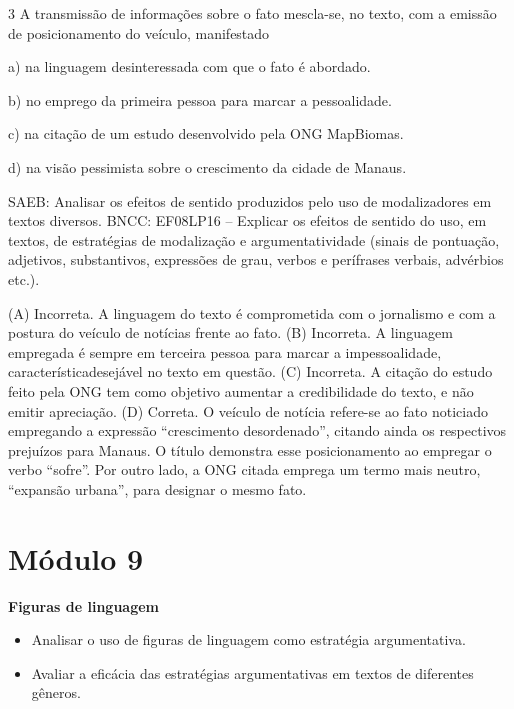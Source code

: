 \num{3} A transmissão de informações sobre o fato mescla-se, no texto,
com a emissão de posicionamento do veículo, manifestado

a) na linguagem desinteressada com que o fato é abordado.

b) no emprego da primeira pessoa para marcar a pessoalidade.

c) na citação de um estudo desenvolvido pela ONG MapBiomas.

d) na visão pessimista sobre o crescimento da cidade de Manaus.

SAEB: Analisar os efeitos de sentido produzidos pelo uso de
modalizadores em textos diversos. BNCC: EF08LP16 -- Explicar os efeitos
de sentido do uso, em textos, de estratégias de modalização e
argumentatividade (sinais de pontuação, adjetivos, substantivos,
expressões de grau, verbos e perífrases verbais, advérbios etc.).

(A) Incorreta. A linguagem do texto é comprometida com o jornalismo e
com a postura do veículo de notícias frente ao fato. (B) Incorreta. A
linguagem empregada é sempre em terceira pessoa para marcar a
impessoalidade, característicadesejável no texto em questão. (C)
Incorreta. A citação do estudo feito pela ONG tem como objetivo aumentar
a credibilidade do texto, e não emitir apreciação. (D) Correta. O
veículo de notícia refere-se ao fato noticiado empregando a expressão
``crescimento desordenado'', citando ainda os respectivos prejuízos para
Manaus. O título demonstra esse posicionamento ao empregar o verbo
``sofre''. Por outro lado, a ONG citada emprega um termo mais neutro,
``expansão urbana'', para designar o mesmo fato.

\hypertarget{muxf3dulo-9}{%
\section{Módulo 9}\label{muxf3dulo-9}}

\textbf{Figuras de linguagem}


\begin{itemize}
\tightlist
\item
  Analisar o uso de figuras de linguagem como estratégia argumentativa.
\item
  Avaliar a eficácia das estratégias argumentativas em textos de
  diferentes gêneros.
\end{itemize}


